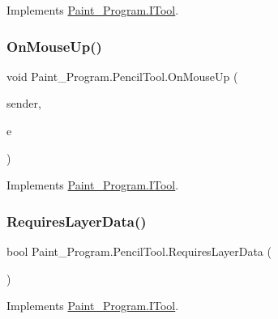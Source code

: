 Implements \mbox{\hyperlink{interface_paint___program_1_1_i_tool_a6a1cbe840b5cfc8a9b9463cc21590845}{Paint\+\_\+\+Program.\+I\+Tool}}.

\mbox{\label{class_paint___program_1_1_pencil_tool_ad59c1709d381a33f8363fd15f526eb0e}} 
\subsubsection{\texorpdfstring{On\+Mouse\+Up()}{OnMouseUp()}}
{\footnotesize\ttfamily void Paint\+\_\+\+Program.\+Pencil\+Tool.\+On\+Mouse\+Up (\begin{DoxyParamCaption}\item[{object}]{sender,  }\item[{Mouse\+Event\+Args}]{e }\end{DoxyParamCaption})\hspace{0.3cm}{\ttfamily [inline]}}



Implements \mbox{\hyperlink{interface_paint___program_1_1_i_tool_a47984c2879213022f1684c07f7bba73e}{Paint\+\_\+\+Program.\+I\+Tool}}.

\mbox{\label{class_paint___program_1_1_pencil_tool_ae41c314454969364d7bdf85e584faf46}} 
\subsubsection{\texorpdfstring{Requires\+Layer\+Data()}{RequiresLayerData()}}
{\footnotesize\ttfamily bool Paint\+\_\+\+Program.\+Pencil\+Tool.\+Requires\+Layer\+Data (\begin{DoxyParamCaption}{ }\end{DoxyParamCaption})\hspace{0.3cm}{\ttfamily [inline]}}



Implements \mbox{\hyperlink{interface_paint___program_1_1_i_tool_a6d45b6c48da8130ae41db3a66cdaef9a}{Paint\+\_\+\+Program.\+I\+Tool}}.

